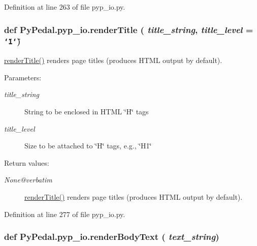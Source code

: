 Definition at line 263 of file pyp\_\-io.py.\hypertarget{namespacePyPedal_1_1pyp__io_5cb50a90451714409cb52600c9731e38}{
\subsubsection[renderTitle]{\setlength{\rightskip}{0pt plus 5cm}def Py\-Pedal.pyp\_\-io.render\-Title ( {\em title\_\-string},  {\em title\_\-level} = {\tt \char`\"{}1\char`\"{}})}}
\label{namespacePyPedal_1_1pyp__io_5cb50a90451714409cb52600c9731e38}


\hyperlink{namespacePyPedal_1_1pyp__io_5cb50a90451714409cb52600c9731e38}{render\-Title()} renders page titles (produces HTML output by default). 

\begin{Desc}
\item[Parameters:]
\begin{description}
\item[{\em title\_\-string}]String to be enclosed in HTML \char`\"{}H\char`\"{} tags \item[{\em title\_\-level}]Size to be attached to \char`\"{}H\char`\"{} tags, e.g., \char`\"{}H1\char`\"{} \end{description}
\end{Desc}
\begin{Desc}
\item[Return values:]
\begin{description}
\item[{\em None@verbatim}]\hyperlink{namespacePyPedal_1_1pyp__io_5cb50a90451714409cb52600c9731e38}{render\-Title()} renders page titles (produces HTML output by default).  \end{description}
\end{Desc}


Definition at line 277 of file pyp\_\-io.py.\hypertarget{namespacePyPedal_1_1pyp__io_23579dde930ef86ed159126ab4068a46}{
\subsubsection[renderBodyText]{\setlength{\rightskip}{0pt plus 5cm}def Py\-Pedal.pyp\_\-io.render\-Body\-Text ( {\em text\_\-string})}}
\label{namespacePyPedal_1_1pyp__io_23579dde930ef86ed159126ab4068a46}


